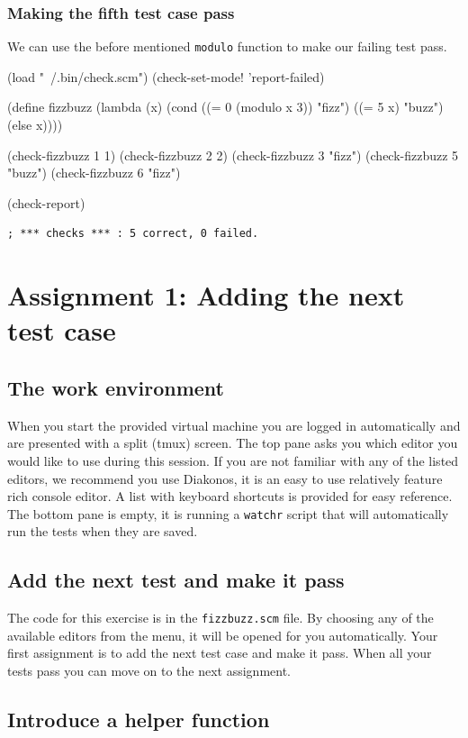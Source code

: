 \documentclass[12pt,a4paper,english,twoside]{article}
\begin{document}
\subsubsection{Making the fifth test case pass}
We can use the before mentioned \texttt{modulo} function to make our failing 
test pass.
\begin{schemecode}
(load "~/.bin/check.scm")
(check-set-mode! 'report-failed)

(define fizzbuzz 
  (lambda (x) 
    (cond ((= 0 (modulo x 3)) "fizz")
          ((= 5 x) "buzz")
          (else x))))

(check-fizzbuzz 1 1)
(check-fizzbuzz 2 2)
(check-fizzbuzz 3 "fizz")
(check-fizzbuzz 5 "buzz")
(check-fizzbuzz 6 "fizz")

(check-report)
\end{schemecode}
\begin{lstlisting}
; *** checks *** : 5 correct, 0 failed.
\end{lstlisting}
\section{Assignment 1: Adding the next test case}
\subsection{The work environment}
When you start the provided virtual machine you are logged in automatically 
and are presented with a split (tmux) screen. The top pane asks you which editor you 
would like to use during this session. If you are not familiar with any of the listed editors, we recommend you use Diakonos, it is an easy to use relatively feature rich console editor. A list with keyboard shortcuts is provided for easy reference. The bottom pane is empty, it is running a \texttt{watchr} script that will automatically run the tests when they are 
saved. 
\subsection{Add the next test and make it pass}
The code for this exercise is in the \texttt{fizzbuzz.scm} file.  By choosing 
any of the available editors from the menu, it will be opened for you 
automatically. Your first assignment is to add the next test case and make it 
pass. When all your tests pass you can move on to the next assignment.
\subsection{Introduce a helper function}
\end{document}
